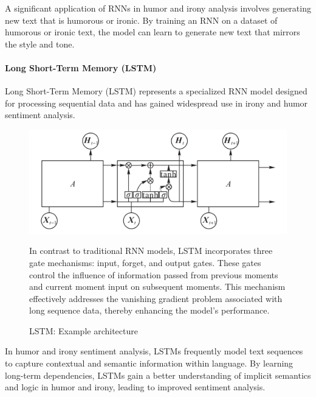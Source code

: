 \documentclass[a4paper]{article}
\begin{document}
A significant application of RNNs in humor and irony analysis involves generating new text that is humorous or ironic. By training an RNN on a dataset of humorous or ironic text, the model can learn to generate new text that mirrors the style and tone.

\paragraph{Long Short-Term Memory (LSTM)}

Long Short-Term Memory (LSTM) represents a specialized RNN model designed for processing sequential data and has gained widespread use in irony and humor sentiment analysis.

\begin{figure}[H]
    \centering
    \begin{minipage}{0.48\textwidth}
        \centering
        \includegraphics[width=1\textwidth]{./images/LSTM_architecture.png}
        \caption{LSTM: Example architecture \cite{ref_rnn1}}
        \label{fig.LSTM}
    \end{minipage}\hfill
    \begin{minipage}{0.48\textwidth}
        In contrast to traditional RNN models, LSTM incorporates three gate mechanisms: input, forget, and output gates. These gates control the influence of information passed from previous moments and current moment input on subsequent moments. This mechanism effectively addresses the vanishing gradient problem associated with long sequence data, thereby enhancing the model's performance.
    \end{minipage}
\end{figure}

In humor and irony sentiment analysis, LSTMs frequently model text sequences to capture contextual and semantic information within language. By learning long-term dependencies, LSTMs gain a better understanding of implicit semantics and logic in humor and irony, leading to improved sentiment analysis.
\end{document}
